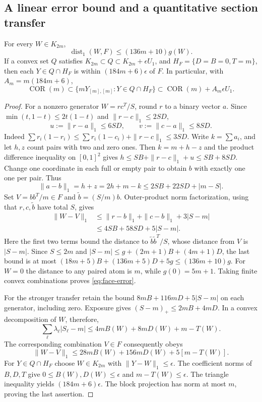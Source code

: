\subsection{A linear error bound and a quantitative section transfer}
\begin{proposition}[Stability]\label{prop:correlation-stability}
For every $W\in K_{2m}$,
\begin{equation}\label{eq:face-error}
 \operatorname{dist}_1(W,F)\le(136m+10)g(W).
\end{equation}
If a convex set $Q$ satisfies $K_{2m}\subset Q\subset K_{2m}+\epsilon U_1$,
and $H_F=\{D=B=0,T=m\}$, then each $Y\in Q\cap H_F$ is within
$(184m+6)\epsilon$ of $F$. In particular, with $A_m=m(184m+6)$,
\begin{equation}\label{eq:face-outer-transfer}
 \operatorname{COR}(m)\subset\{mY_{[m],[m]}:Y\in Q\cap H_F\}
 \subset\operatorname{COR}(m)+A_m\epsilon U_1.
\end{equation}
\end{proposition}
\begin{proof}
For a nonzero generator $W=rc^T/S$, round $r$ to a binary vector $a$.
Since $\min(t,1-t)\le2t(1-t)$ and $\|r-c\|_1\le2SD$,
\[
 u:=\|r-a\|_1\le6SD,\qquad v:=\|c-a\|_1\le8SD.
\]
Indeed $\sum r_i(1-r_i)\le\sum r_i(1-c_i)+\|r-c\|_1\le3SD$.
Write $k=\sum a_i$, and let $h,z$ count pairs with two and zero ones.
Then $k=m+h-z$ and the product difference inequality on $[0,1]^2$ gives
$h\le SB+\|r-c\|_1+u\le SB+8SD$.
Change one coordinate in each full or empty pair to obtain $b$ with exactly
one one per pair. Thus
\[
 \|a-b\|_1=h+z=2h+m-k\le2SB+22SD+|m-S|.
\]
Set $V=bb^T/m\in F$ and $\widetilde b=(S/m)b$. Outer-product norm
factorization, using that $r,c,\widetilde b$ have total $S$, gives
\begin{align*}
 \|W-V\|_1
 &\le\|r-b\|_1+\|c-b\|_1+3|S-m|\\
 &\le4SB+58SD+5|S-m|.
\end{align*}
Here the first two terms bound the distance to
$\widetilde b\widetilde b^T/S$, whose distance from $V$ is $|S-m|$.
Since $S\le2m$ and
$|S-m|\le g+(2m+1)B+(4m+1)D$, the last bound is at most
$(18m+5)B+(136m+5)D+5g\le(136m+10)g$.
For $W=0$ the distance to any paired atom is $m$, while $g(0)=5m+1$.
Taking finite convex combinations proves \eqref{eq:face-error}.

For the stronger transfer retain the bound
$8mB+116mD+5|S-m|$ on each generator, including zero. Exposure gives
$(S-m)_+\le2mB+4mD$. In a convex decomposition of $W$, therefore,
\[
 \sum_\ell\lambda_\ell|S_\ell-m|
 \le4mB(W)+8mD(W)+m-T(W).
\]
The corresponding combination $V\in F$ consequently obeys
\[
 \|W-V\|_1\le28mB(W)+156mD(W)+5[m-T(W)].
\]
For $Y\in Q\cap H_F$ choose $W\in K_{2m}$ with
$\|Y-W\|_1\le\epsilon$. The coefficient norms of $B,D,T$ give
$0\le B(W),D(W)\le\epsilon$ and $m-T(W)\le\epsilon$.
The triangle inequality yields $(184m+6)\epsilon$.
The block projection has norm at most $m$, proving the last assertion.
\end{proof}
